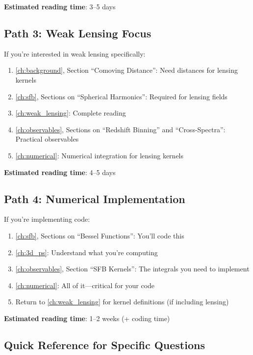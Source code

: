 \textbf{Estimated reading time}: 3--5 days

\subsection{Path 3: Weak Lensing Focus}\label{subsec:guide_lensing}

If you're interested in weak lensing specifically:

\begin{enumerate}
    \item \cref{ch:background}, Section ``Comoving Distance'': Need distances for lensing kernels
    \item \cref{ch:sfb}, Sections on ``Spherical Harmonics'': Required for lensing fields
    \item \cref{ch:weak_lensing}: Complete reading
    \item \cref{ch:observables}, Sections on ``Redshift Binning'' and ``Cross-Spectra'': Practical observables
    \item \cref{ch:numerical}: Numerical integration for lensing kernels
\end{enumerate}

\textbf{Estimated reading time}: 4--5 days

\subsection{Path 4: Numerical Implementation}\label{subsec:guide_numerical}

If you're implementing code:

\begin{enumerate}
    \item \cref{ch:sfb}, Sections on ``Bessel Functions'': You'll code this
    \item \cref{ch:3d_ps}: Understand what you're computing
    \item \cref{ch:observables}, Section ``SFB Kernels'': The integrals you need to implement
    \item \cref{ch:numerical}: All of it—critical for your code
    \item Return to \cref{ch:weak_lensing} for kernel definitions (if including lensing)
\end{enumerate}

\textbf{Estimated reading time}: 1--2 weeks (+ coding time)

\subsection{Quick Reference for Specific Questions}\label{subsec:guide_quick}


